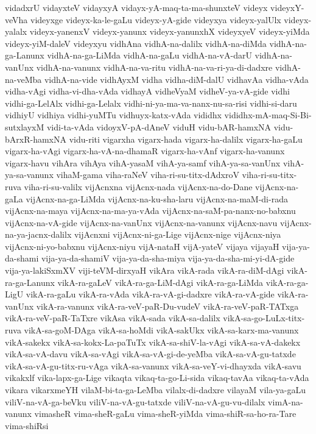 {vidadxrU
vidayxteV
vidayxyA
vidayx-yA-maq-ta-ma-shunxteV
videyx
videyxY-veVha
videyxge
videyx-ka-le-gaLu
videyx-yA-gide
videyxya
videyx-yalUlx
videyx-yalalx
videyx-yanenxV
videyx-yanunx
videyx-yanunxhX
videyxyeV
videyx-yiMda
videyx-yiM-daleV
videyxyu
vidhAna
vidhA-na-dalilx
vidhA-na-diMda
vidhA-na-ga-Lanunx
vidhA-na-ga-LiMda
vidhA-na-gaLu
vidhA-na-vA-darU
vidhA-na-vanUnx
vidhA-na-vanunx
vidhA-na-va-ritu
vidhA-na-va-ri-ya-di-dadxre
vidhA-na-veMba
vidhA-na-vide
vidhAyxM
vidha
vidha-diM-dalU
vidhavAa
vidha-vAda
vidha-vAgi
vidha-vi-dha-vAda
vidhayA
vidheVyaM
vidheV-ya-vA-gide
vidhi
vidhi-ga-LelAlx
vidhi-ga-Lelalx
vidhi-ni-ya-ma-va-nanx-nu-sa-risi
vidhi-si-daru
vidhiyU
vidhiya
vidhi-yuMTu
vidhuyx-katx-vAda
vididhx
vididhx-mA-maq-Si-Bi-sutxlayxM
vidi-ta-vAda
vidoyxV-pA-dAneV
viduH
vidu-bAR-hamxNA
vidu-bArxR-hamxNA
vidu-riti
vigarxha
vigarx-hada
vigarx-ha-dalilx
vigarx-ha-gaLu
vigarx-ha-vAgi
vigarx-ha-vA-na-dhamaR
vigarx-ha-vAnf
vigarx-ha-vanunx
vigarx-havu
vihAra
vihAya
vihA-yasaM
vihA-ya-samf
vihA-ya-sa-vanUnx
vihA-ya-sa-vanunx
vihaM-gama
viha-raNeV
viha-ri-su-titx-dAdxroV
viha-ri-su-titx-ruva
viha-ri-su-valilx
vijAcnxna
vijAcnx-nada
vijAcnx-na-do-Dane
vijAcnx-na-gaLa
vijAcnx-na-ga-LiMda
vijAcnx-na-ku-sha-laru
vijAcnx-na-maM-di-rada
vijAcnx-na-maya
vijAcnx-na-ma-ya-vAda
vijAcnx-na-saM-pa-nanx-no-babxnu
vijAcnx-na-vA-gide
vijAcnx-na-vanUnx
vijAcnx-na-vanunx
vijAcnx-navu
vijAcnx-na-ya-jacnx-dalilx
vijAcnxni
vijAcnx-ni-ga-Lige
vijAcnx-nige
vijAcnx-niya
vijAcnx-ni-yo-babxnu
vijAcnx-niyu
vijA-nataH
vijA-yateV
vijaya
vijayaH
vija-ya-da-shami
vija-ya-da-shamiV
vija-ya-da-sha-miya
vija-ya-da-sha-mi-yi-dA-gide
vija-ya-lakiSxmXV
viji-teVM-dirxyaH
vikAra
vikA-rada
vikA-ra-diM-dAgi
vikA-ra-ga-Lanunx
vikA-ra-gaLeV
vikA-ra-ga-LiM-dAgi
vikA-ra-ga-LiMda
vikA-ra-ga-LigU
vikA-ra-gaLu
vikA-ra-vAda
vikA-ra-vA-gi-dadxre
vikA-ra-vA-gide
vikA-ra-vanUnx
vikA-ra-vanunx
vikA-ra-veV-paR-Du-vudeV
vikA-ra-veV-paR-TATxga
vikA-ra-veV-paR-TaTxre
vikAsa
vikA-sada
vikA-sa-dalilx
vikA-sa-go-LuLx-titx-ruva
vikA-sa-goM-DAga
vikA-sa-hoMdi
vikA-sakUkx
vikA-sa-karx-ma-vanunx
vikA-sakekx
vikA-sa-kokx-La-paTuTx
vikA-sa-shiV-la-vAgi
vikA-sa-vA-dakekx
vikA-sa-vA-davu
vikA-sa-vAgi
vikA-sa-vA-gi-de-yeMba
vikA-sa-vA-gu-tatxde
vikA-sa-vA-gu-titx-ru-vAga
vikA-sa-vanunx
vikA-sa-veY-vi-dhayxda
vikA-savu
vikakxlf
vika-lapx-ga-Lige
vikaqta
vikaq-ta-go-Li-sida
vikaq-tavAa
vikaq-ta-vAda
vikara
vikarxmeYH
vilaM-bi-ta-ga-LeMba
vilalx-di-dadxre
vilayaM
vila-ya-gaLu
viliV-na-vA-ga-beVku
viliV-na-vA-gu-tatxde
viliV-na-vA-gu-vu-dilalx
vimA-na-vanunx
vimasheR
vima-sheR-gaLu
vima-sheR-yiMda
vima-shiR-sa-ho-ra-Tare
vima-shiRsi
}
